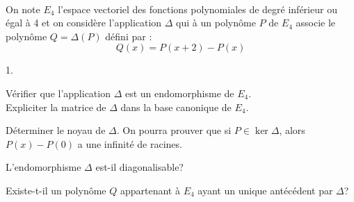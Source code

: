 \documentclass[11pt]{article}%
\begin{document}
\begin{exerciceSP}~\\
  On note $E_4$ l'espace vectoriel des fonctions polynomiales de degré
  inférieur ou égal à 4 et on considère l'application $\Delta$ qui à
  un polynôme $P$ de $E_4$ associe le polynôme $Q = \Delta (P)$ défini
  par :
  \[
  Q(x) = P(x+2) - P(x)
  \]
  \begin{noliste}{1.}
    \setlength{\itemsep}{2mm}
  \item Vérifier que l'application $\Delta$ est un endomorphisme de $E_4$. \\
    Expliciter la matrice de $\Delta$ dans la base canonique de $E_4$.
  \item Déterminer le noyau de $\Delta$. On pourra prouver que si $P
    \in \ker \Delta$, alors $P(x) - P(0)$ a une infinité de racines.
  \item L'endomorphisme $\Delta$ est-il diagonalisable?
  \item Existe-t-il un polynôme $Q$ appartenant à $E_4$ ayant un
    unique antécédent par $\Delta$?
  \end{noliste}
\end{exerciceSP}


\newpage
\end{document}
